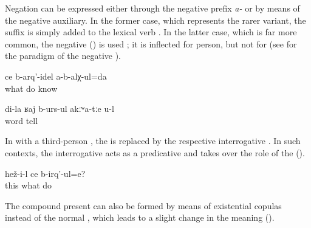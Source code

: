 Negation can be expressed either through the negative prefix \textit{a-} or by means of the negative auxiliary. In the former case, which represents the rarer variant, the  suffix is simply added to the lexical verb . In the latter case, which is far more common, the negative    () is used ; it is inflected for person, but not for  (see  for the paradigm of the negative ).

\begin{exe}
	\ex	\label{ex:I do not know what to do analytic}
	\gll	ce	b-arq'-idel	a-b-alχ-ul=da\\
		what	do	know\\
	\glt	{}

	\ex	\label{ex:You tell only my words analytic}
	\gll	di-la	ʁaj	b-urs-ul	akːʷa-tːe	u-l\\
			word	tell		\\
	\glt	{}
\end{exe}

In  with a third-person , the  is replaced by the respective interrogative  . In such contexts, the interrogative  acts as a predicative  and takes over the role of the  ().

\begin{exe}
	\ex	\label{ex:What is he doing analytic}
	\gll	hež-i-l	ce	b-irq'-ul=e?\\
		this	what	do\\
	\glt	{}
\end{exe}

The compound present can also be formed by means of existential copulas instead of the normal , which leads to a slight change in the meaning ().




